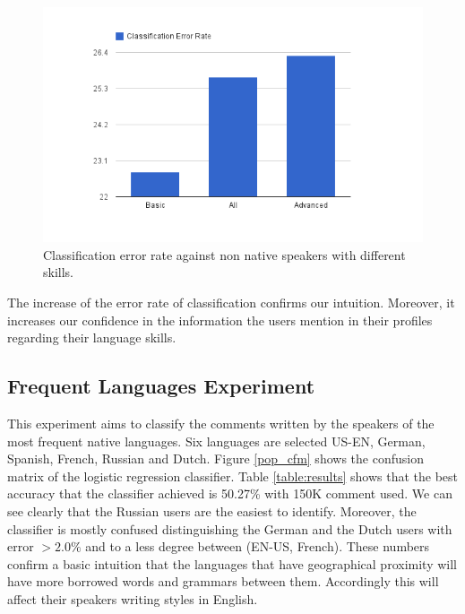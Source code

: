 \documentclass[10pt,a5paper,twoside]{article}
\begin{document}
\begin{figure}
\centering
\includegraphics[scale=0.50]{fluency.png}
\caption{Classification error rate against non native speakers with different
skills.}
\label{fluency}
\end{figure}

The increase of the error rate of classification confirms our intuition.
Moreover, it increases our confidence in the information the users mention in
their profiles regarding their language skills.

\subsection{Frequent Languages Experiment}
\label{frequent}
This experiment aims to classify the comments written by the speakers of the most frequent native languages.
Six languages are selected US-EN, German, Spanish, French, Russian and Dutch.
Figure \ref{pop_cfm} shows the confusion matrix of the logistic regression
classifier.
Table \ref{table:results} shows that the best accuracy that the classifier
achieved is 50.27\% with 150K comment used. We can see clearly that the
Russian users are the easiest to identify. Moreover, the classifier is mostly
confused distinguishing the German and the Dutch users with error $>2.0\%$ and
to a less degree between (EN-US, French). These numbers confirm a basic
intuition that the languages that have geographical proximity will have more
borrowed words and grammars between them. Accordingly this will affect their speakers writing styles in English.
\end{document}
